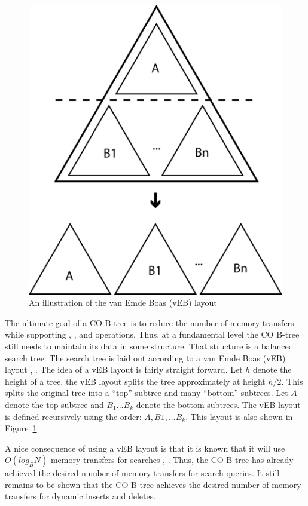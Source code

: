 \documentclass{style}
\begin{document}
\begin{figure}

\begin{center}
	\includegraphics[width=0.8\columnwidth]{figures/veb.pdf}
\end{center}

\caption{An illustration of the van Emde Boas (vEB) layout}
\label{fig:veb}
\end{figure}


The ultimate goal of a CO B-tree is to reduce the number of memory transfers
while supporting \Search{}, \Insert{}, and \Delete{} operations. Thus, at a
fundamental level the CO B-tree still needs to maintain its data in some
structure. That structure is a balanced search tree. The search tree is laid
out according to a van Emde Boas (vEB) layout \cite{veb1}, \cite{veb2}. The idea of a vEB
layout is fairly straight forward. Let $h$ denote the height of a tree. the
vEB layout splits the tree approximately at height $h/2$. This splits the
original tree into a ``top'' subtree and many ``bottom'' subtrees. Let $A$
denote the top subtree and $B_1... B_k$ denote the bottom subtrees. The vEB
layout is defined recursively using the order: $A, B1, ... B_k$. This layout
is also shown in Figure~\ref{fig:veb}.

A nice consequence of using a vEB layout is that it is known that it will use
$O(log_B N)$ memory transfers for searches \cite{veb1}, \cite{veb2}. Thus, the CO B-tree has already
achieved the desired number of memory transfers for search queries. It
still remains to be shown that the CO B-tree achieves the desired number of
memory transfers for dynamic inserts and deletes.
\end{document}
